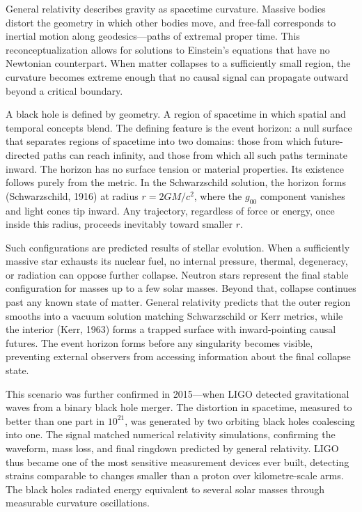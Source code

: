 General relativity describes gravity as spacetime curvature. Massive bodies distort the geometry in which other bodies move, and free-fall corresponds to inertial motion along geodesics—paths of extremal proper time.
This reconceptualization allows for solutions to Einstein's equations that have no Newtonian counterpart. When matter collapses to a sufficiently small region, the curvature becomes extreme enough that no causal signal can propagate outward beyond a critical boundary.

A black hole is defined by geometry. A region of spacetime in which spatial and temporal concepts blend. The defining feature is the event horizon: a null surface that separates regions of spacetime into two domains: those from which future-directed paths can reach infinity, and those from which all such paths terminate inward. The horizon has no surface tension or material properties. Its existence follows purely from the metric. In the Schwarzschild solution, the horizon forms (Schwarzschild, 1916) at radius $r = 2GM/c^2$, where the $g_{00}$ component vanishes and light cones tip inward. Any trajectory, regardless of force or energy, once inside this radius, proceeds inevitably toward smaller $r$. 

Such configurations are predicted results of stellar evolution. When a sufficiently massive star exhausts its nuclear fuel, no internal pressure, thermal, degeneracy, or radiation can oppose further collapse. Neutron stars represent the final stable configuration for masses up to a few solar masses. Beyond that, collapse continues past any known state of matter. General relativity predicts that the outer region smooths into a vacuum solution matching Schwarzschild or Kerr metrics, while the interior (Kerr, 1963) forms a trapped surface with inward-pointing causal futures. The event horizon forms before any singularity becomes visible, preventing external observers from accessing information about the final collapse state.

This scenario was further confirmed in 2015—when LIGO detected gravitational waves from a binary black hole merger. The distortion in spacetime, measured to better than one part in $10^{21}$, was generated by two orbiting black holes coalescing into one. The signal matched numerical relativity simulations, confirming the waveform, mass loss, and final ringdown predicted by general relativity. LIGO thus became one of the most sensitive measurement devices ever built, detecting strains comparable to changes smaller than a proton over kilometre-scale arms. The black holes radiated energy equivalent to several solar masses through measurable curvature oscillations.

